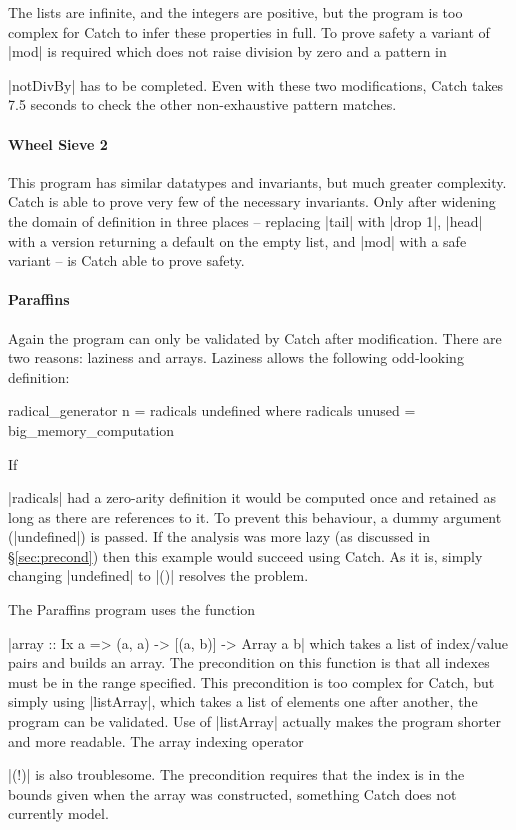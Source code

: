 \documentclass[preprint]{sigplanconf}
\begin{document}
The lists are infinite, and the integers are positive, but the program is too complex for Catch to infer these properties in full. To prove safety a variant of |mod| is required which does not raise division by zero and a pattern in \ignore|notDivBy| has to be completed. Even with these two modifications, Catch takes 7.5 seconds to check the other non-exhaustive pattern matches.


\paragraph{Wheel Sieve 2}

This program has similar datatypes and invariants, but much greater complexity. Catch is able to prove very few of the necessary invariants. Only after widening the domain of definition in three places -- replacing |tail| with |drop 1|, |head| with a version returning a default on the empty list, and |mod| with a safe variant -- is Catch able to prove safety.


\paragraph{Paraffins}

Again the program can only be validated by Catch after modification. There are two reasons: laziness and arrays. Laziness allows the following odd-looking definition:

\begin{comment}
\begin{code}
big_memory_computation = undefined
\end{code}
\end{comment}

\begin{code}
radical_generator n = radicals undefined
  where radicals unused = big_memory_computation
\end{code}

If \ignore|radicals| had a zero-arity definition it would be computed once and retained as long as there are references to it. To prevent this behaviour, a dummy argument (|undefined|) is passed. If the analysis was more lazy (as discussed in \S\ref{sec:precond}) then this example would succeed using Catch. As it is, simply changing |undefined| to |()| resolves the problem.

The Paraffins program uses the function \ignore|array :: Ix a => (a, a) -> [(a, b)] -> Array a b| which takes a list of index/value pairs and builds an array. The precondition on this function is that all indexes must be in the range specified. This precondition is too complex for Catch, but simply using |listArray|, which takes a list of elements one after another, the program can be validated. Use of |listArray| actually makes the program shorter and more readable. The array indexing operator \ignore|(!)| is also troublesome. The precondition requires that the index is in the bounds given when the array was constructed, something Catch does not currently model.
\end{document}
